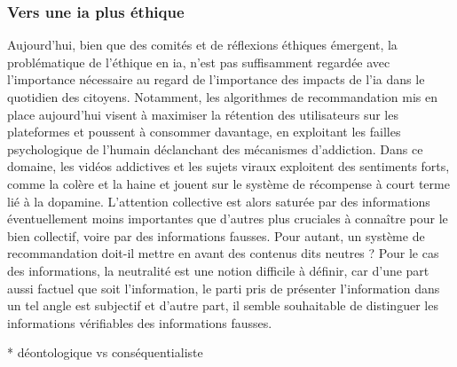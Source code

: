 \cite{ethique-cnil}
\subsubsection{Vers une \gls{ia} plus éthique}

Aujourd'hui, bien que des comités et de réflexions éthiques émergent, la problématique de l'éthique en \gls{ia}, n'est pas suffisamment regardée avec l'importance nécessaire au regard de l'importance des impacts de l'\gls{ia} dans le quotidien des citoyens.
Notamment, les algorithmes de recommandation mis en place aujourd'hui visent à maximiser la rétention des utilisateurs sur les plateformes et poussent à consommer davantage, en exploitant les failles psychologique de l'humain déclanchant des mécanismes d'addiction. Dans ce domaine, les vidéos addictives et les sujets viraux exploitent des sentiments forts, comme la colère et la haine et jouent sur le système de récompense à court terme lié à la dopamine. L'attention collective est alors saturée par des informations éventuellement moins importantes que d'autres plus cruciales à connaître pour le bien collectif, voire par des informations fausses.
Pour autant, un système de recommandation doit-il mettre en avant des contenus dits neutres ? Pour le cas des informations, la neutralité est une notion difficile à définir, car d'une part aussi factuel que soit l'information, le parti pris de présenter l'information dans un tel angle est subjectif et d'autre part, il semble souhaitable de distinguer les informations vérifiables des informations fausses.


* déontologique vs conséquentialiste